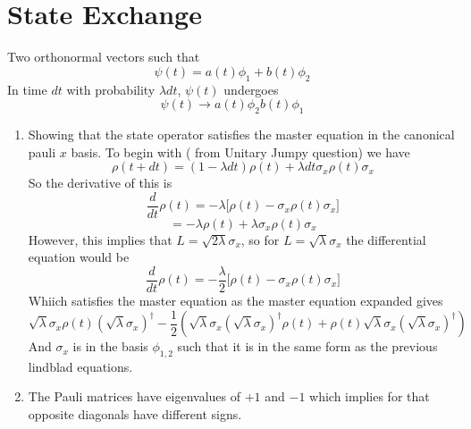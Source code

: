 \documentclass[12pt]{article}
\begin{document}
\section{State Exchange} 
Two orthonormal vectors such that 
$$ \psi (t) = a(t) \phi_1 + b(t) \phi_2 $$
In time $dt$ with probability $\lambda dt$, $\psi (t)$ undergoes 
$$ \psi (t) \rightarrow a (t) \phi_2 b(t) \phi_1 $$
\begin{enumerate}
    \item Showing that the state operator satisfies the master equation in the canonical pauli $x$ basis. To begin with ( from Unitary Jumpy question) we have 
    $$ \rho (t + dt) = ( 1- \lambda dt) \rho (t) + \lambda dt \sigma_x \rho (t) \sigma_x $$
    So the derivative of this is 
    $$ \frac{d}{dt} \rho (t) = - \lambda \Big[ \rho (t) - \sigma_x \rho (t) \sigma_x \Big] $$
    $$ = - \lambda \rho (t) + \lambda \sigma_x \rho (t) \sigma_x $$
    However, this implies that $L = \sqrt{2 \lambda} \sigma_x$, so for $L = \sqrt{ \lambda} \sigma_x$ the differential equation would be 
    $$ \frac{d}{dt} \rho (t) = - \frac{\lambda}{2} \Big[ \rho (t) - \sigma_x \rho (t) \sigma_x \Big] $$
    Whiich satisfies the master equation as the master equation expanded gives 
    $$ \sqrt{\lambda} \sigma_x \rho (t) (\sqrt{\lambda}\sigma_x)^{\dagger} - \frac{1}{2} ( \sqrt{\lambda} \sigma_x (\sqrt{\lambda} \sigma_x )^{\dagger} \rho (t) + \rho(t) \sqrt{\lambda} \sigma_x ( \sqrt{\lambda} \sigma_x)^{\dagger} ) $$
    And $\sigma_x$ is in the basis $\phi_{1,2}$ such that it is in the same form as the previous lindblad equations.

    \item The Pauli matrices have eigenvalues of $+1$ and $-1$ which implies for that opposite diagonals have different signs. 
    
\end{enumerate}
\end{document}
